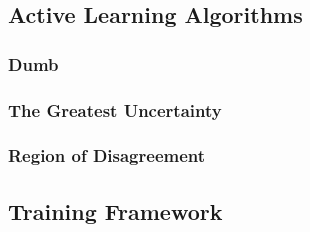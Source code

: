 \subsection{Active Learning Algorithms}
\subsubsection{Dumb}
\blindtext[1]
\subsubsection{The Greatest Uncertainty}
\blindtext[1]
\subsubsection{Region of Disagreement}
\blindtext[1]
\subsection{Training Framework}
\blindtext[1]
